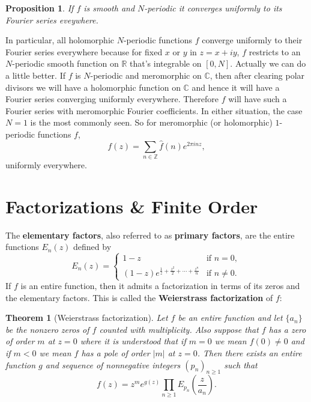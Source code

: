 \documentclass[12pt]{book}
\newtheorem{theorem}{Theorem}[section]
\newtheorem{proposition}{Proposition}[section]
\theoremstyle{definition}\newframedtheorem{method}{Method}
\newcommand{\Z}{\mathbb{Z}}
\newcommand{\R}{\mathbb{R}}
\newcommand{\C}{\mathbb{C}}
\newcommand{\<}{\langle}
\renewcommand{\>}{\rangle}
\begin{document}
      \begin{proposition}
        If $f$ is smooth and $N$-periodic it converges uniformly to its Fourier series eveywhere.
      \end{proposition}

      In particular, all holomorphic $N$-periodic functions $f$ converge uniformly to their Fourier series everywhere because for fixed $x$ or $y$ in $z = x+iy$, $f$ restricts to an $N$-periodic smooth function on $\R$ that's integrable on $[0,N]$. Actually we can do a little better. If $f$ is $N$-periodic and meromorphic on $\C$, then after clearing polar divisors we will have a holomorphic function on $\C$ and hence it will have a Fourier series converging uniformly everywhere. Therefore $f$ will have such a Fourier series with meromorphic Fourier coefficients. In either situation, the case $N = 1$ is the most commonly seen. So for meromorphic (or holomorphic) $1$-periodic functions $f$,
      \[
        f(z) = \sum_{n \in \Z}\hat{f}(n)e^{2\pi inz},
      \]
      uniformly everywhere.
  \section{Factorizations \& Finite Order}\label{append:Factorizations_and_Finite_Order}
    The \textbf{elementary factors}, also referred to as \textbf{primary factors}, are the entire functions $E_{n}(z)$ defined by
    \[
      E_{n}(z) = \begin{cases} 1-z & \text{if } n = 0, \\ (1-z)e^{\frac{1}{z}+\frac{z^{2}}{2}+\cdots+\frac{z^{n}}{n}} & \text{if } n \neq 0. \end{cases}
    \]
    If $f$ is an entire function, then it admits a factorization in terms of its zeros and the elementary factors. This is called the \textbf{Weierstrass factorization} of $f$:

    \begin{theorem}[Weierstrass factorization]
      Let $f$ be an entire function and let $\{a_{n}\}$ be the nonzero zeros of $f$ counted with multiplicity. Also suppose that $f$ has a zero of order $m$ at $z = 0$ where it is understood that if $m = 0$ we mean $f(0) \neq 0$ and if $m < 0$ we mean $f$ has a pole of order $|m|$ at $z = 0$. Then there exists an entire function $g$ and sequence of nonnegative integers $(p_{n})_{n \ge 1}$ such that
      \[
        f(z) = z^{m}e^{g(z)}\prod_{n \ge 1}E_{p_{n}}\left(\frac{z}{a_{n}}\right).
      \]
    \end{theorem}
\end{document}
